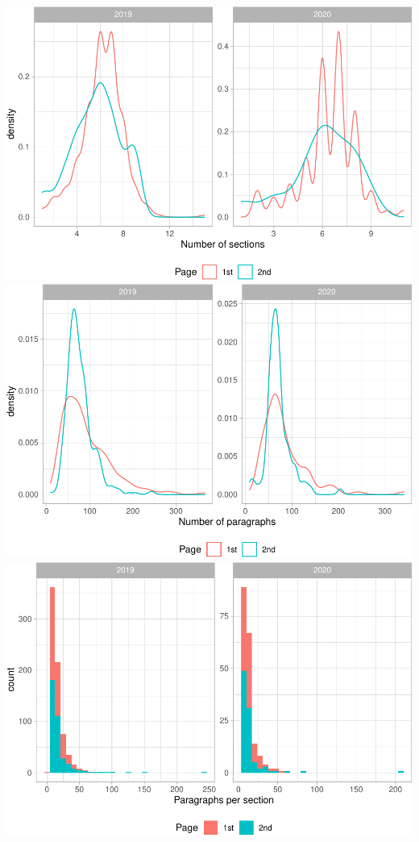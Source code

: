 \documentclass[
  12pt,
]{article}
\begin{document}
\includegraphics{text_analysis_files/figure-latex/plotting-1.pdf} \includegraphics{text_analysis_files/figure-latex/plotting-2.pdf} \includegraphics{text_analysis_files/figure-latex/plotting-3.pdf}
\end{document}
